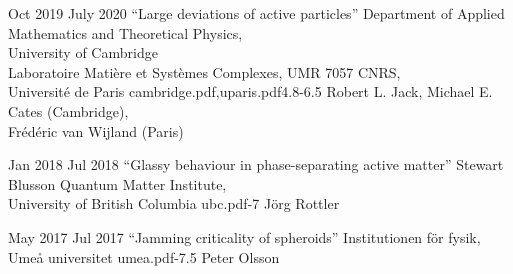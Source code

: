 \documentclass[a4paper]{cvtemplate_en} %
\begin{document}
\begin{cvbody}

\cvitem
	{Oct 2019}
	{July 2020}
  {``Large deviations of active particles''}
  {Department of Applied Mathematics and Theoretical Physics,\\ University of Cambridge \\
	Laboratoire Mati\`ere et Syst\`emes Complexes, UMR 7057 CNRS,\\ Universit\'e de Paris }
  {cambridge.pdf,uparis.pdf}{4.8}{-6.5}
	{Robert L. Jack, Michael E. Cates (Cambridge),\\ Fr\'ed\'eric van Wijland (Paris)}
  {\\}

\cvitem
	{Jan 2018}
	{Jul 2018}
  {``Glassy behaviour in phase-separating active matter''}
  {Stewart Blusson Quantum Matter Institute,\\ University of British Columbia }
  {ubc.pdf}{}{-7}
  {J\"org Rottler}
  {\\
  }

\cvitem
	{May 2017}
	{Jul 2017}
	{``Jamming criticality of spheroids''}
	{Institutionen f\"{o}r fysik, Ume\r{a} universitet }
	{umea.pdf}{}{-7.5}
	{Peter Olsson}
	{\\
	}


\end{cvbody}
\end{document}
